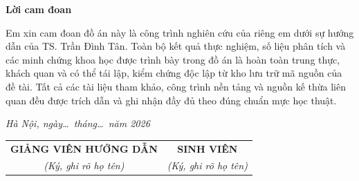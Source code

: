 
\begin{center}
    \Large{\textbf{Lời cam đoan}}
\end{center}
\vspace{1cm}

Em xin cam đoan đồ án này là công trình nghiên cứu của riêng em dưới sự hướng dẫn của TS. Trần Đình Tân. Toàn bộ kết quả thực nghiệm, số liệu phân tích và các minh chứng khoa học được trình bày trong đồ án là hoàn toàn trung thực, khách quan và có thể tái lập, kiểm chứng độc lập từ kho lưu trữ mã nguồn của đề tài. Tất cả các tài liệu tham khảo, công trình nền tảng và nguồn kế thừa liên quan đều được trích dẫn và ghi nhận đầy đủ theo đúng chuẩn mực học thuật.

\vspace{0.8cm}


\vspace{1cm}

\begin{flushright}
\textit{Hà Nội, ngày\ldots\ tháng\ldots\ năm 2026}
\end{flushright}

\begin{table}[H]
\renewcommand{\arraystretch}{1.5}
\setlength{\tabcolsep}{40pt} %
\centering
\begin{tabular}{p{7cm}p{7cm}}
\multicolumn{1}{c}{\textbf{GIẢNG VIÊN HƯỚNG DẪN}} &
\multicolumn{1}{c}{\textbf{SINH VIÊN}} \\[2pt]
\multicolumn{1}{c}{\textit{(Ký, ghi rõ họ tên)}} &
\multicolumn{1}{c}{\textit{(Ký, ghi rõ họ tên)}} \\[12pt]
\end{tabular}
\end{table}

\pagebreak
